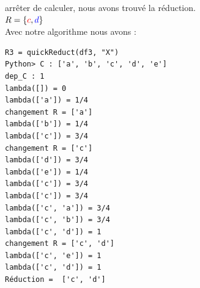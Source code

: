 arrêter de calculer, nous avons trouvé la réduction. \\
$R = \{\textcolor{red}{c}, \textcolor{blue}{d}\}$ \\
Avec notre algorithme nous avons :
\begin{lstlisting}
R3 = quickReduct(df3, "X")
Python> C : ['a', 'b', 'c', 'd', 'e']
dep_C : 1
lambda([]) = 0
lambda(['a']) = 1/4
changement R = ['a']
lambda(['b']) = 1/4
lambda(['c']) = 3/4
changement R = ['c']
lambda(['d']) = 3/4
lambda(['e']) = 1/4
lambda(['c']) = 3/4
lambda(['c']) = 3/4
lambda(['c', 'a']) = 3/4
lambda(['c', 'b']) = 3/4
lambda(['c', 'd']) = 1
changement R = ['c', 'd']
lambda(['c', 'e']) = 1
lambda(['c', 'd']) = 1
Réduction =  ['c', 'd']
\end{lstlisting}